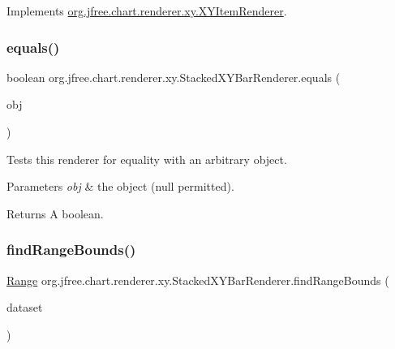 Implements \mbox{\hyperlink{interfaceorg_1_1jfree_1_1chart_1_1renderer_1_1xy_1_1_x_y_item_renderer_ad867040a3ea09f5127596aacdd94586a}{org.\+jfree.\+chart.\+renderer.\+xy.\+X\+Y\+Item\+Renderer}}.

\mbox{\label{classorg_1_1jfree_1_1chart_1_1renderer_1_1xy_1_1_stacked_x_y_bar_renderer_a11782a2f26229f68f7d9996f0e44d82c}} 
\subsubsection{\texorpdfstring{equals()}{equals()}}
{\footnotesize\ttfamily boolean org.\+jfree.\+chart.\+renderer.\+xy.\+Stacked\+X\+Y\+Bar\+Renderer.\+equals (\begin{DoxyParamCaption}\item[{Object}]{obj }\end{DoxyParamCaption})}

Tests this renderer for equality with an arbitrary object.


\begin{DoxyParams}{Parameters}
{\em obj} & the object ({\ttfamily null} permitted).\\
\hline
\end{DoxyParams}
\begin{DoxyReturn}{Returns}
A boolean. 
\end{DoxyReturn}
\mbox{\label{classorg_1_1jfree_1_1chart_1_1renderer_1_1xy_1_1_stacked_x_y_bar_renderer_a3d3f95bf3ab4db2209bf36862ab96d5b}} 
\subsubsection{\texorpdfstring{find\+Range\+Bounds()}{findRangeBounds()}}
{\footnotesize\ttfamily \mbox{\hyperlink{classorg_1_1jfree_1_1data_1_1_range}{Range}} org.\+jfree.\+chart.\+renderer.\+xy.\+Stacked\+X\+Y\+Bar\+Renderer.\+find\+Range\+Bounds (\begin{DoxyParamCaption}\item[{\mbox{\hyperlink{interfaceorg_1_1jfree_1_1data_1_1xy_1_1_x_y_dataset}{X\+Y\+Dataset}}}]{dataset }\end{DoxyParamCaption})}

